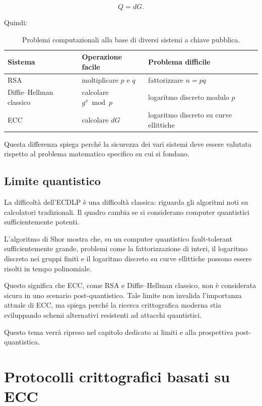 \documentclass[12pt,a4paper,oneside]{report}
\begin{document}
\[
Q=dG.
\]

Quindi:

\begin{table}[h]
\centering
\begin{tabular}{lll}
\toprule
\textbf{Sistema} & \textbf{Operazione facile} & \textbf{Problema difficile} \\
\midrule
RSA & moltiplicare \(p\) e \(q\) & fattorizzare \(n=pq\) \\
Diffie--Hellman classico & calcolare \(g^x \bmod p\) & logaritmo discreto modulo \(p\) \\
ECC & calcolare \(dG\) & logaritmo discreto su curve ellittiche \\
\bottomrule
\end{tabular}
\caption{Problemi computazionali alla base di diversi sistemi a chiave pubblica.}
\label{tab:public-key-hardness}
\end{table}

Questa differenza spiega perché la sicurezza dei vari sistemi deve essere valutata rispetto al problema matematico specifico su cui si fondano.

\section{Limite quantistico}

La difficoltà dell'ECDLP è una difficoltà classica: riguarda gli algoritmi noti su calcolatori tradizionali. Il quadro cambia se si considerano computer quantistici sufficientemente potenti.

L'algoritmo di Shor mostra che, su un computer quantistico fault-tolerant sufficientemente grande, problemi come la fattorizzazione di interi, il logaritmo discreto nei gruppi finiti e il logaritmo discreto su curve ellittiche possono essere risolti in tempo polinomiale.

Questo significa che ECC, come RSA e Diffie--Hellman classico, non è considerata sicura in uno scenario post-quantistico. Tale limite non invalida l'importanza attuale di ECC, ma spiega perché la ricerca crittografica moderna stia sviluppando schemi alternativi resistenti ad attacchi quantistici.

Questo tema verrà ripreso nel capitolo dedicato ai limiti e alla prospettiva post-quantistica.

\chapter{Protocolli crittografici basati su ECC}
\end{document}

